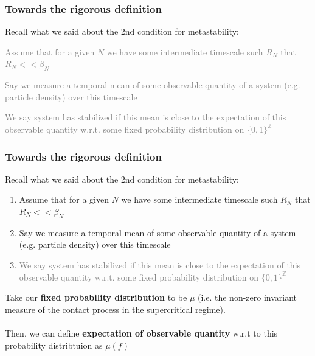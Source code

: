 \documentclass{beamer}
\begin{document}
\begin{frame}
    \frametitle{Towards the rigorous definition}

    Recall what we said about the 2nd condition for metastability:

    \begin{enumerate}
        \item \textcolor{gray}{Assume that for a given $N$ we have some intermediate timescale such $R_N$ that $R_N << \beta_N$
            \item Say we measure a temporal mean of some observable quantity of a system (e.g. particle density) over this timescale
            \item We say system has stabilized if this mean is close to the expectation of this observable quantity w.r.t. some fixed probability distribution on $\{0,1\}^{\mathbb{Z}}$}
    \end{enumerate}
\end{frame}

\begin{frame}
    \frametitle{Towards the rigorous definition}

    Recall what we said about the 2nd condition for metastability:

    \begin{enumerate}
            \item Assume that for a given $N$ we have some intermediate timescale such $R_N$ that $R_N << \beta_N$
            \item Say we measure a temporal mean of some observable quantity of a system (e.g. particle density) over this timescale
            \item \textcolor{gray}{We say system has stabilized if this mean is close to the expectation of this observable quantity w.r.t. some fixed probability distribution on $\{0,1\}^{\mathbb{Z}}$}
    \end{enumerate}
\end{frame}

\begin{frame}
    Take our \textbf{fixed probability distribution} to be $\mu$ (i.e. the non-zero invariant measure of the contact process in the supercritical regime). \\~\\

    Then, we can define \textbf{expectation of observable quantity} w.r.t to this probability distribtuion as $\mu(f)$
\end{frame}
\end{document}
